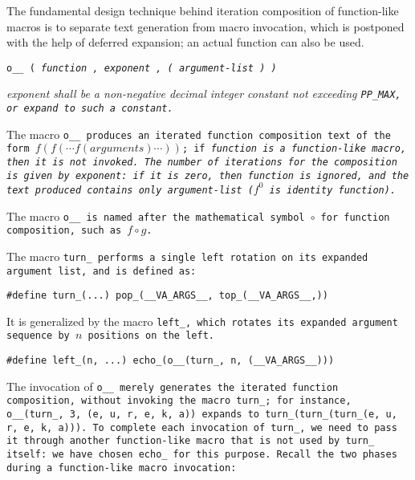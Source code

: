 The fundamental design technique behind iteration composition of function-like
macros is to separate text generation from macro invocation, which is postponed
with the help of deferred expansion; an actual function can also be used.


\tt{o__ (} \it{function} \tt{,} \it{exponent} \tt{, (} \it{argument-list} \tt{) )}


\it{exponent} shall be a non-negative decimal integer constant
not exceeding \tt{PP_MAX}, or expand to such a constant.


The macro \tt{o__} produces an iterated function composition
text of the form $f(f(\cdots f(arguments)\cdots))$;
if \it{function} is a function-like macro, then it is not invoked.
The number of iterations for the composition is given by \it{exponent}:
if it is zero, then \it{function} is ignored, and the text produced
contains only \it{argument-list} ($f^0$ is identity function).

\note The macro \tt{o__} is named after the mathematical
symbol $\circ$ for function composition, such as $f \circ g$.

\example The macro \tt{turn_} performs a single left
rotation on its expanded argument list, and is defined as:

\begin{center}
\tt{#define turn_(...) pop_(__VA_ARGS__, top_(__VA_ARGS__,))}
\end{center}

It is generalized by the macro \tt{left_}, which rotates
its expanded argument sequence by $n$ positions on the left.

\begin{center}
\tt{#define left_(n, ...) echo_(o__(turn_, n, (__VA_ARGS__)))}
\end{center}

The invocation of \tt{o__} merely generates the iterated function
composition, without invoking the macro \tt{turn_}; for instance,
\tt{o__(turn_, 3, (e, u, r, e, k, a))} expands to
\tt{turn_(turn_(turn_(e, u, r, e, k, a)))}.
To complete each invocation of \tt{turn_}, we need to pass it through
another function-like macro that is not used by \tt{turn_} itself:
we have chosen \tt{echo_} for this purpose.
Recall the two phases during a function-like macro invocation:

